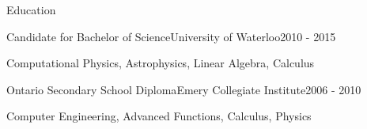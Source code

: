 \documentclass{resume}
\begin{document}
  \begin{rSection}{Education}

    \begin{rEducation}{Candidate for Bachelor of Science}{University of Waterloo}{}{2010 - 2015}
      \item Computational Physics, Astrophysics, Linear Algebra, Calculus
    \end{rEducation}

    \begin{rEducation}{Ontario Secondary School Diploma}{Emery Collegiate Institute}{}{2006 - 2010}
      \item Computer Engineering, Advanced Functions, Calculus, Physics
    \end{rEducation}

  \end{rSection}
\end{document}
